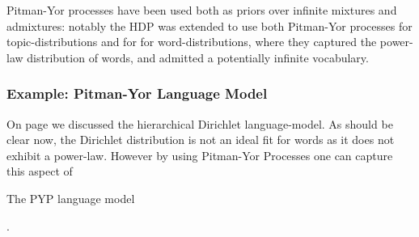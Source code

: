 Pitman-Yor processes have been used both as priors over infinite mixtures and admixtures: notably the HDP was extended to use both Pitman-Yor processes for topic-distributions and for for word-distributions\cite{Buntine2014}, where they captured the power-law distribution of words, and admitted a potentially infinite vocabulary.

\subsubsection*{Example: Pitman-Yor Language Model}
On page \pageref{sec:chap1:mackay-lang-model} we discussed the hierarchical Dirichlet language-model. As should be clear now, the Dirichlet distribution is not an ideal fit for words as it does not exhibit a power-law. However by using Pitman-Yor Processes one can capture this aspect of 

The PYP language model\cite{Teh2002}




.




 


